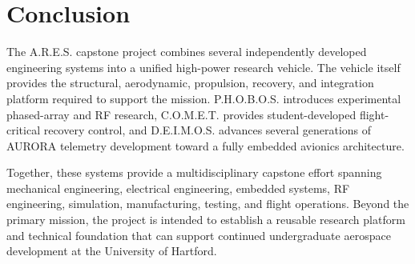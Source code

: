\documentclass[11pt,twocolumn]{IEEEtran}
\newcommand{\comet}{C.O.M.E.T.}
\newcommand{\ares}{A.R.E.S.}
\newcommand{\phobos}{P.H.O.B.O.S.}
\newcommand{\deimos}{D.E.I.M.O.S.}
\begin{document}
\section{Conclusion}

The \ares{} capstone project combines several independently developed engineering systems into a unified high-power research vehicle. The vehicle itself provides the structural, aerodynamic, propulsion, recovery, and integration platform required to support the mission. \phobos{} introduces experimental phased-array and RF research, \comet{} provides student-developed flight-critical recovery control, and \deimos{} advances several generations of AURORA telemetry development toward a fully embedded avionics architecture.

Together, these systems provide a multidisciplinary capstone effort spanning mechanical engineering, electrical engineering, embedded systems, RF engineering, simulation, manufacturing, testing, and flight operations. Beyond the primary mission, the project is intended to establish a reusable research platform and technical foundation that can support continued undergraduate aerospace development at the University of Hartford.

\end{document}

